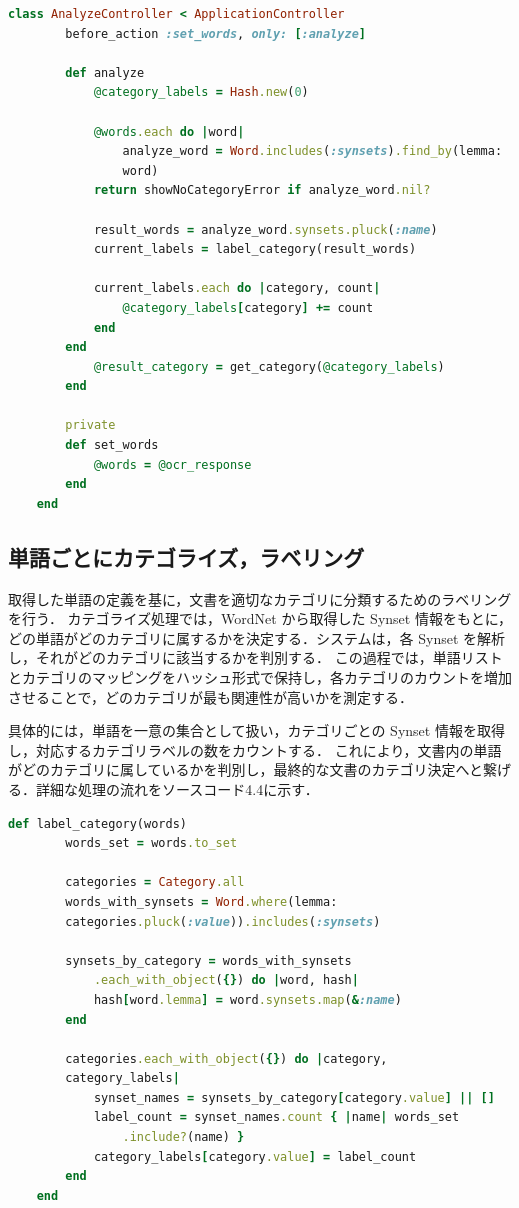 \begin{lstlisting}[language=Ruby, caption=ActiveRecord による WordNet との連携]
    class AnalyzeController < ApplicationController
        before_action :set_words, only: [:analyze]

        def analyze
            @category_labels = Hash.new(0)

            @words.each do |word|
                analyze_word = Word.includes(:synsets).find_by(lemma:
                word)
            return showNoCategoryError if analyze_word.nil?

            result_words = analyze_word.synsets.pluck(:name)
            current_labels = label_category(result_words)

            current_labels.each do |category, count|
                @category_labels[category] += count
            end
        end
            @result_category = get_category(@category_labels)
        end

        private
        def set_words
            @words = @ocr_response
        end
    end
\end{lstlisting}

\clearpage

\subsection{単語ごとにカテゴライズ，ラベリング}
\label{subsec:app_categolize}

取得した単語の定義を基に，文書を適切なカテゴリに分類するためのラベリングを行う．
カテゴライズ処理では，WordNet から取得した Synset 情報をもとに，どの単語がどのカテゴリに属するかを決定する．システムは，各 Synset を解析し，それがどのカテゴリに該当するかを判別する．
この過程では，単語リストとカテゴリのマッピングをハッシュ形式で保持し，各カテゴリのカウントを増加させることで，どのカテゴリが最も関連性が高いかを測定する．

具体的には，単語を一意の集合として扱い，カテゴリごとの Synset 情報を取得し，対応するカテゴリラベルの数をカウントする．
これにより，文書内の単語がどのカテゴリに属しているかを判別し，最終的な文書のカテゴリ決定へと繋げる．詳細な処理の流れをソースコード4.4に示す．

\begin{lstlisting}[language=Ruby, caption=カテゴリのラベリングメソッド]
    def label_category(words)
        words_set = words.to_set

        categories = Category.all
        words_with_synsets = Word.where(lemma:
        categories.pluck(:value)).includes(:synsets)

        synsets_by_category = words_with_synsets
            .each_with_object({}) do |word, hash|
            hash[word.lemma] = word.synsets.map(&:name)
        end

        categories.each_with_object({}) do |category,
        category_labels|
            synset_names = synsets_by_category[category.value] || []
            label_count = synset_names.count { |name| words_set
                .include?(name) }
            category_labels[category.value] = label_count
        end
    end
\end{lstlisting}

